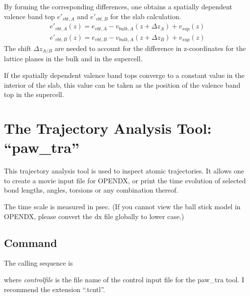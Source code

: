 \documentclass[final,12pt]{article}
\begin{document}
{{{{{{By forming the corresponding differences, one obtains a spatially
dependent valence band top $e'_{vbt,A}$ and $e'_{vbt,B}$ 
for the slab calculation.
\begin{eqnarray*}
e'_{vbt,A}(z)=e_{vbt,A}-v_{bulk,A}(z+\Delta z_A)+v_{sup}(z)
\\
e'_{vbt,B}(z)=e_{vbt,B}-v_{bulk,A}(z+\Delta z_B)+v_{sup}(z)
\end{eqnarray*}
The shift $\Delta z_{A/B}$ are needed to account for the difference in
z-coordinates for the lattice planes in the bulk and in the supercell.

If the spatially dependent valence band tops converge to a constant
value in the interior of the slab, this value can be taken as the
position of the valence band top in the supercell.
 

\newpage
\section{The Trajectory Analysis Tool: ``paw\_tra''}
This trajectory analysis tool is used to inspect atomic trajectories. It
allows one to create a movie input file for OPENDX\cite{opendx}, or print the
time evolution of selected bond lengths, angles, torsions or any combination
thereof.

The time scale is measured in psec. (If you cannot view the ball stick
model in OPENDX\cite{opendx}, please convert the dx file globally to
lower case.)

\subsection{Command}
The calling sequence is

\bigskip{}\bigskip

\noindent
where {\it controlfile} is the file name of the control input file for
the paw\_tra tool. I recommend the extension
``.tcntl''.

}}}}}}
\end{document}
